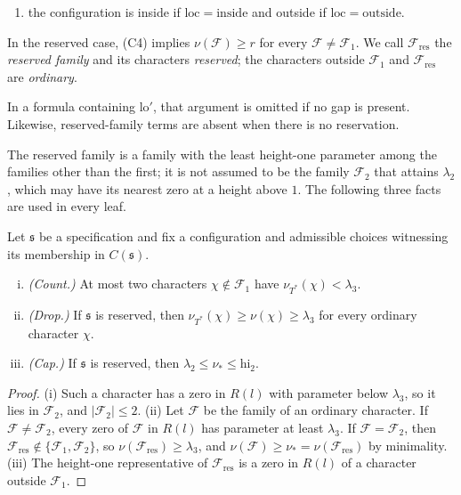 \documentclass[11pt]{amsart}
\numberwithin{equation}{section}
\theoremstyle{plain}
\theoremstyle{definition}
\theoremstyle{remark}
\newcommand{\lo}{\mathrm{lo}}
\newcommand{\hi}{\mathrm{hi}}
\newcommand{\1}{\mathbf{1}}
\begin{document}
\begin{definition}[Specification]
\begin{enumerate}[(C1)]
    $\nu(\mathcal F_{\mathrm{res}})=\nu_*$ has exactly $n_2$ characters (so it is a real character if $n_2=1$ and
    a pair of conjugate nonreal characters if $n_2=2$);
  \item the configuration is inside if $\mathrm{loc}=\mathrm{inside}$ and outside if $\mathrm{loc}=\mathrm{outside}$.
\end{enumerate}
In the reserved case, (C4) implies $\nu(\mathcal F)\ge r$ for every $\mathcal F\ne\mathcal F_1$. We call $\mathcal F_{\mathrm{res}}$ the
\emph{reserved family} and its characters \emph{reserved}; the characters outside $\mathcal F_1$ and
$\mathcal F_{\mathrm{res}}$ are \emph{ordinary}.
\end{definition}

In a formula containing $\lo'$, that argument is omitted if no gap is present.
Likewise, reserved-family terms are absent when there is no reservation.

The reserved family is a family with the least height-one parameter among the families other than
the first; it is not assumed to be the family $\mathcal F_2$ that attains $\lambda_2$, which may have its
nearest zero at a height above $1$. The following three facts are used in every leaf.

\begin{lemma}\label{lem:familyfacts}
Let $\mathfrak s$ be a specification and fix a configuration and admissible choices
witnessing its membership in $C(\mathfrak s)$.
\begin{enumerate}[(i)]
  \item \emph{(Count.)} At most two characters $\chi\notin \mathcal F_1$ have $\nu_{T^*}(\chi)<\lambda_3$.
  \item \emph{(Drop.)} If $\mathfrak s$ is reserved, then $\nu_{T^*}(\chi)\ge\nu(\chi)\ge\lambda_3$ for every
    ordinary character $\chi$.
  \item \emph{(Cap.)} If $\mathfrak s$ is reserved, then $\lambda_2\le\nu_*\le\hi_2$.
\end{enumerate}
\end{lemma}

\begin{proof}
(i) Such a character has a zero in $R(l)$ with parameter below $\lambda_3$, so it lies in $\mathcal F_2$, and
$|\mathcal F_2|\le2$. (ii) Let $\mathcal F$ be the family of an ordinary character. If $\mathcal F\ne\mathcal F_2$, every zero of $\mathcal F$
in $R(l)$ has parameter at least $\lambda_3$. If $\mathcal F=\mathcal F_2$, then $\mathcal F_{\mathrm{res}}\notin\{\mathcal F_1,\mathcal F_2\}$, so
$\nu(\mathcal F_{\mathrm{res}})\ge\lambda_3$, and $\nu(\mathcal F)\ge\nu_*=\nu(\mathcal F_{\mathrm{res}})$ by minimality. (iii) The
height-one representative of $\mathcal F_{\mathrm{res}}$ is a zero in $R(l)$ of a character outside $\mathcal F_1$.
\end{proof}
\end{document}
